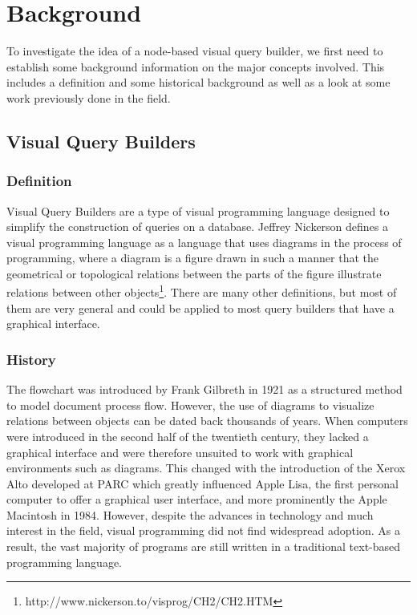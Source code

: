 \documentclass[11pt,a4paper]{globis-book}
\begin{document}
\section{Background}
\label{sec:background}
To investigate the idea of a node-based visual query builder, we first need to establish some background information on the major concepts involved. This includes a definition and some historical background as well as a look at some work previously done in the field.

\subsection{Visual Query Builders}
\label{sec:vis_qb}
\subsubsection*{Definition}
Visual Query Builders are a type of visual programming language designed to simplify the construction of queries on a database. Jeffrey Nickerson defines a visual programming language as a language that uses diagrams in the process of programming, where a diagram is a figure drawn in such a manner that the geometrical or topological relations between the parts of the figure illustrate relations between other objects\footnote{http://www.nickerson.to/visprog/CH2/CH2.HTM}. There are many other definitions, but most of them are very general and could be applied to most query builders that have a graphical interface.

\subsubsection*{History}
The flowchart was introduced by Frank Gilbreth in 1921 as a structured method to model document process flow. However, the use of diagrams to visualize relations between objects can be dated back thousands of years. When computers were introduced in the second half of the twentieth century, they lacked a graphical interface and were therefore unsuited to work with graphical environments such as diagrams. This changed with the introduction of the Xerox Alto developed at PARC which greatly influenced Apple Lisa, the first personal computer to offer a graphical user interface, and more prominently the Apple Macintosh in 1984. However, despite the advances in technology and much interest in the field, visual programming did not find widespread adoption. As a result, the vast majority of programs are still written in a traditional text-based programming language.
\end{document}
